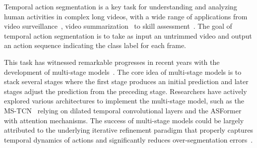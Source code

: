 \documentclass[10pt,twocolumn,letterpaper]{article}
\begin{document}
Temporal action segmentation is a key task for understanding and analyzing human activities in complex long videos, with a wide range of applications from video surveillance~\cite{Surveillance}, video summarization~\cite{Summarization} to skill assessment~\cite{Skill}.
The goal of temporal action segmentation is to take as input an untrimmed video and output an action sequence indicating the class label for each frame.

This task has witnessed remarkable progresses in recent years with the development of multi-stage models~\cite{2019_CVPR_Farha,2020_PAMI_Li,2020_ECCV_Wang,2021_BMVC_Yi}.
The core idea of multi-stage models is to stack several stages where the first stage produces
an initial prediction and later stages adjust the prediction from the preceding stage.
Researchers have actively explored various architectures to implement the multi-stage model, such as the MS-TCN~\cite{2019_CVPR_Farha,2020_PAMI_Li} relying on dilated temporal convolutional layers and the ASFormer~\cite{2021_BMVC_Yi} with attention mechanisms. 
The success of multi-stage models could be largely attributed to the underlying iterative refinement paradigm that properly captures temporal dynamics of actions and significantly reduces over-segmentation errors~\cite{2022_Arxiv_Ding}.
\end{document}

